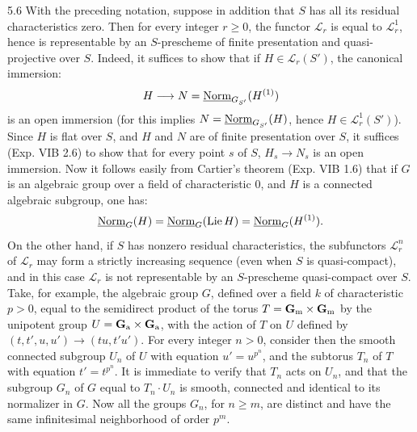 \begin{remark}{5.6}\label{XV.5.6}
With the preceding notation, suppose in addition that $S$ has all its residual characteristics zero. Then for every integer $r\geq0$, the functor $\mathscr L_r$ is equal to $\mathscr L_r^1$, hence is representable by an $S$-prescheme of finite presentation and quasi-projective over $S$. Indeed, it suffices to show that if $H\in\mathscr L_r(S')$, the canonical immersion:
\[
H\longrightarrow N=\underline{\mathrm{Norm}}_{G_{S'}}(H^{(1)})
\]
is an open immersion (for this implies $N=\underline{\mathrm{Norm}}_{G_{S'}}(H)$, hence $H\in\mathscr L_r^1(S')$). Since $H$ is flat over $S$, and $H$ and $N$ are of finite presentation over $S$, it suffices (Exp. VIB 2.6) to show that for every point $s$ of $S$, $H_s\to N_s$ is an open immersion. Now it follows easily from Cartier's theorem (Exp. VIB 1.6) that if $G$ is an algebraic group over a field of characteristic $0$, and $H$ is a connected algebraic subgroup, one has:
\[
\underline{\mathrm{Norm}}_G(H)=\underline{\mathrm{Norm}}_G(\operatorname{Lie} H)=\underline{\mathrm{Norm}}_G(H^{(1)}).
\]
On the other hand, if $S$ has nonzero residual characteristics, the subfunctors $\mathscr L_r^n$ of $\mathscr L_r$ may form a strictly increasing sequence (even when $S$ is quasi-compact), and in this case $\mathscr L_r$ is not representable by an $S$-prescheme quasi-compact over $S$. Take, for example, the algebraic group $G$, defined over a field $k$ of characteristic $p>0$, equal to the semidirect product of the torus $T=\mathbf{G}_{\mathrm{m}}\times\mathbf{G}_{\mathrm{m}}$ by the unipotent group $U=\mathbf{G}_{\mathrm{a}}\times\mathbf{G}_{\mathrm{a}}$, with the action of $T$ on $U$ defined by $(t,t',u,u')\to(tu,t'u')$. For every integer $n>0$, consider then the smooth connected subgroup $U_n$ of $U$ with equation $u'=u^{p^n}$, and the subtorus $T_n$ of $T$ with equation $t'=t^{p^n}$. It is immediate to verify that $T_n$ acts on $U_n$, and that the subgroup $G_n$ of $G$ equal to $T_n\cdot U_n$ is smooth, connected and identical to its normalizer in $G$. Now all the groups $G_n$, for $n\geq m$, are distinct and have the same infinitesimal neighborhood of order $p^m$.
\end{remark}

